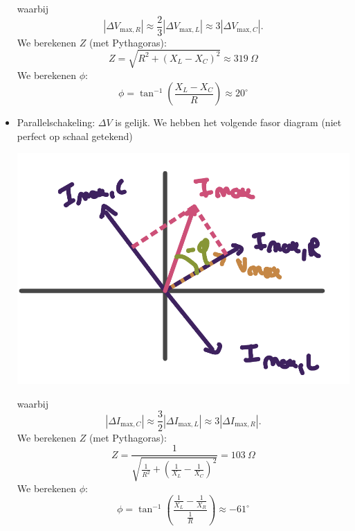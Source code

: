 \begin{description}[labelwidth=1.5cm, leftmargin=!]
\begin{itemize}
\begin{center}
                \end{center}
                waarbij 
                \begin{equation*}
                    |\Delta V_{\text{max},R}| \approx \frac{2}{3}|\Delta V_{\text{max},L}| \approx 3|\Delta V_{\text{max},C}|.
                \end{equation*}
                We berekenen $Z$ (met Pythagoras):
                \begin{equation*}
                    Z = \sqrt{R^2 + (X_L - X_C)^2} \approx 319 \ \Omega
                \end{equation*}
                We berekenen $\phi$:
                \begin{equation*}
                    \phi = \tan^{-1}\left(\frac{X_L - X_C}{R}\right) \approx 20^\circ
                \end{equation*}
  
            \item Parallelschakeling: $\Delta V$ is gelijk. We hebben het volgende fasor diagram (niet perfect op schaal getekend)
                \begin{center}
                    \includegraphics[scale=0.3]{oz09/resources/Oz9Oef1-parallel.png}
                \end{center}
                waarbij
                \begin{equation*}
                    |\Delta I_{\text{max},C}| \approx \frac{3}{2}|\Delta I_{\text{max},L}| \approx 3|\Delta I_{\text{max},R}|.
                \end{equation*}
                We berekenen $Z$ (met Pythagoras):
                \begin{equation*}
                    Z = \frac{1}{\sqrt{\frac{1}{R^2} + \left(\frac{1}{X_L} - \frac{1}{X_C}\right)^2}} = 103 \ \Omega
                \end{equation*}
                We berekenen $\phi$:
                \begin{equation*}
                    \phi = \tan^{-1}\left(\frac{\frac{1}{X_L} - \frac{1}{X_R}}{\frac{1}{R}}\right) \approx -61^\circ
                \end{equation*}
        \end{itemize}
\end{description}

\vspace{1cm}